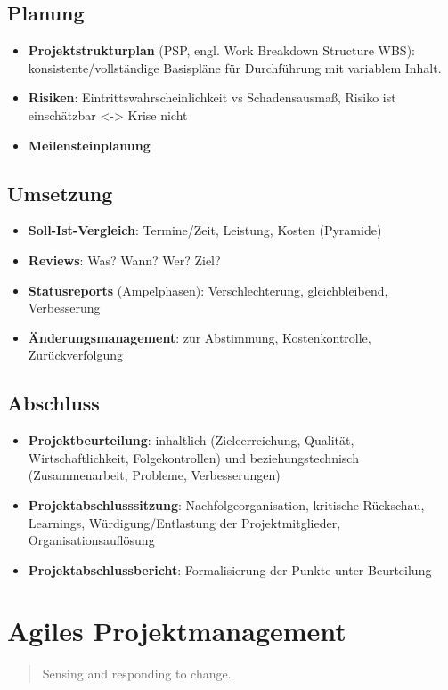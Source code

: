 \documentclass{article}
\begin{document}
\subsection{Planung}
\begin{itemize}
  \item \textbf{Projektstrukturplan} (PSP, engl. Work Breakdown Structure WBS): konsistente/vollständige Basispläne für Durchführung mit variablem Inhalt.
  \item \textbf{Risiken}: Eintrittswahrscheinlichkeit vs Schadensausmaß, Risiko ist einschätzbar <-> Krise nicht
  \item \textbf{Meilensteinplanung}
\end{itemize}

\subsection{Umsetzung}
\begin{itemize}
  \item \textbf{Soll-Ist-Vergleich}: Termine/Zeit, Leistung, Kosten (Pyramide)
  \item \textbf{Reviews}: Was? Wann? Wer? Ziel?
  \item \textbf{Statusreports} (Ampelphasen): Verschlechterung, gleichbleibend, Verbesserung
  \item \textbf{Änderungsmanagement}: zur Abstimmung, Kostenkontrolle, Zurückverfolgung
\end{itemize}

\subsection{Abschluss}
\begin{itemize}
  \item \textbf{Projektbeurteilung}: inhaltlich (Zieleerreichung, Qualität, Wirtschaftlichkeit, Folgekontrollen) und beziehungstechnisch (Zusammenarbeit, Probleme, Verbesserungen)
  \item \textbf{Projektabschlusssitzung}: Nachfolgeorganisation, kritische Rückschau, Learnings, Würdigung/Entlastung der Projektmitglieder, Organisationsauflösung
  \item \textbf{Projektabschlussbericht}: Formalisierung der Punkte unter Beurteilung
\end{itemize}

\section{Agiles Projektmanagement}
\begin{quote}Sensing and responding to change.\end{quote}
\end{document}
